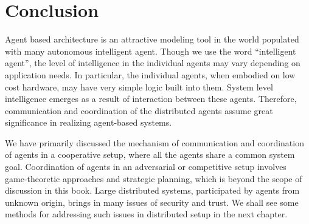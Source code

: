 \section{Conclusion}

Agent based architecture is an attractive modeling tool in the world populated with many autonomous intelligent agent.
Though we use the word ``intelligent agent'', the level of intelligence in the individual agents may vary depending
on application needs. In particular, the individual agents, when embodied on low cost hardware, may have very simple 
logic built into them. System level intelligence emerges as a result of interaction between these agents. Therefore,
communication and coordination of the distributed agents assume great significance in realizing agent-based systems.

We have primarily discussed the mechanism of communication and coordination of agents in a cooperative setup, where
all the agents share a common system goal. Coordination of agents in an adversarial or competitive setup involves
game-theoretic approaches and strategic planning, which is beyond the scope of discussion in this book. Large
distributed systems, participated by agents from unknown origin, brings in many issues of security and trust. We
shall see some methods for addressing such issues in distributed setup in the next chapter.


